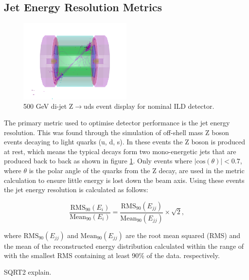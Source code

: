 \subsection{Jet Energy Resolution Metrics}
\begin{figure}
\centering
\includegraphics[width=0.5\textwidth]{OptimisationStudies/Plots/MethodDescription/500GeVEvent.png}
\caption[500 GeV di-jet Z$\rightarrow$uds event display for nominal ILD detector.]{500 GeV di-jet Z$\rightarrow$uds event display for nominal ILD detector.}
\label{fig:500GeVzudsevtdisplay}
\end{figure} 

The primary metric used to optimise detector performance is the jet energy resolution.  This was found through the simulation of off-shell mass Z boson events decaying to light quarks (u, d, s).  In these events the Z boson is produced at rest, which means the typical decays form two mono-energetic jets that are produced back to back as shown in figure \ref{fig:500GeVzudsevtdisplay}.  Only events where $|\text{cos}(\theta)| < 0.7$, where $\theta$ is the polar angle of the quarks from the Z decay, are used in the metric calculation to ensure little energy is lost down the beam axis.  Using these events the jet energy resolution is calculated as follows: 

\begin{equation} 
\frac{\text{RMS}_{90}(E_{i})}{\text{Mean}_{90}(E_{i})} = \frac{\text{RMS}_{90}(E_{jj})}{\text{Mean}_{90}(E_{jj})} \times \sqrt{2} \text{,}
\end{equation}

\begin{flushleft}
where $\text{RMS}_{90}(E_{jj})$ and $\text{Mean}_{90}(E_{jj})$ are the root mean squared (RMS) and the mean of the reconstructed energy distribution calculated within the range of with the smallest RMS containing at least 90\% of the data.
respectively.
\end{flushleft}

SQRT2 explain.

